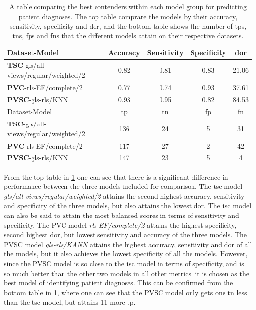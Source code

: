 \begin{table}
    \centering
    \begin{tabular}{lcccc}
        \toprule
        Dataset-Model                                 &  Accuracy &  Sensitivity &  Specificity &  \acrshort{dor} \\
        \midrule
        \textbf{TSC}-gls/all-views/regular/weighted/2 &      0.82 &         0.81 &         0.83 & 21.06 \\
        \textbf{PVC}-rls-EF/complete/2                &      0.77 &         0.74 &         0.93 & 37.61 \\
        \textbf{PVSC}-gls-rls/KNN                     &      0.93 &         0.95 &         0.82 & 84.53 \\
        \midrule
        Dataset-Model                                 &  \acrshort{tp} &  \acrshort{tn} &  \acrshort{fp} &  \acrshort{fn} \\
        \midrule
        \textbf{TSC}-gls/all-views/regular/weighted/2 & 136 &  24 &   5 &  31 \\
        \textbf{PVC}-rls-EF/complete/2                & 117 &  27 &   2 &  42 \\
        \textbf{PVSC}-gls-rls/KNN                     & 147 &  23 &  5  &   4 \\
        \bottomrule
    \end{tabular}
    \caption{A table comparing the best contenders within each model group for predicting patient diagnoses. 
             The top table comprare the models by their accuracy, sensitivity, specificity and \acrshort{dor}, 
             and the bottom table shows the number of \acrshort{tp}s, \acrshort{tn}s, \acrshort{fp}s and \acrshort{fn}s that the different models attain on their respective datasets.}
    \label{tab:pd_compare}
\end{table}

From the top table in \ref{tab:pd_compare} one can see that there is a significant difference in performance between the three models included for comparison.
The \acrshort{tsc} model \textit{gls/all-views/regular/weighted/2} attains the second highest accuracy, sensitivity and specificity of the three models, but also attains the lowest \acrshort{dor}.
The \acrshort{tsc} model can also be said to attain the most balanced scores in terms of sensitivity and specificity. 
The PVC model \textit{rls-EF/complete/2} attains the highest specificity, second highest \acrshort{dor}, but lowest sensitivity and accuracy of the three models. 
The PVSC model \textit{gls-rls/KANN} attains the highest accuracy, sensitivity and \acrshort{dor} of all the models, but it also achieves the lowest specificity of all the models. 
However, since the PVSC model is so close to the \acrshort{tsc} model in terms of specificity, and is so much better than the other two models in all other metrics, it is chosen as the best model of 
identifying patient diagnoses.
This can be confirmed from the bottom table in \ref{tab:pd_compare}, where one can see that the PVSC model only gets one \acrshort{tn} less than the \acrshort{tsc} model, but attains 11 more \acrshort{tp}.

